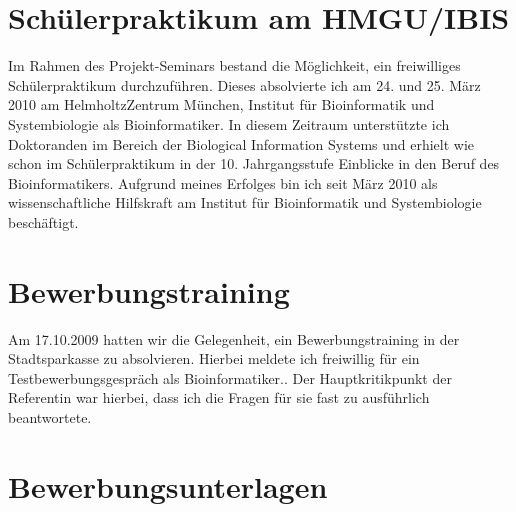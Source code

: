 \documentclass[a4paper,12pt,twoside]{scrbook}
\begin{document}
\section{Schülerpraktikum am HMGU/IBIS}
Im Rahmen des Projekt-Seminars bestand die Möglichkeit, ein freiwilliges Schülerpraktikum durchzuführen.
Dieses absolvierte ich am 24. und 25. März 2010 am HelmholtzZentrum München, Institut für Bioinformatik und Systembiologie als Bioinformatiker.
In diesem Zeitraum unterstützte ich Doktoranden im Bereich der Biological Information Systems und erhielt wie schon im Schülerpraktikum in der 10. Jahrgangsstufe Einblicke in den Beruf des Bioinformatikers.
Aufgrund meines Erfolges bin ich seit März 2010 als wissenschaftliche Hilfskraft am Institut für Bioinformatik und Systembiologie beschäftigt.
\section{Bewerbungstraining}
Am 17.10.2009 hatten wir die Gelegenheit, ein Bewerbungstraining in der Stadtsparkasse zu absolvieren.
Hierbei meldete ich freiwillig für ein Testbewerbungsgespräch als Bioinformatiker..
Der Hauptkritikpunkt der Referentin war hierbei, dass ich die Fragen für sie fast zu ausführlich beantwortete.
\newpage\section{Bewerbungsunterlagen}\newpage
\end{document}
